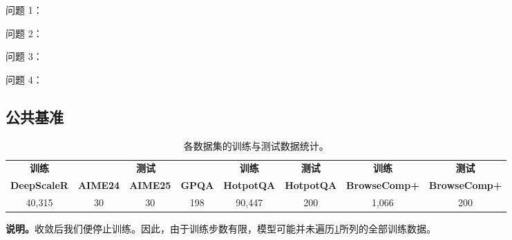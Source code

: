 \begin{userprompt}[title={答案}]
问题 1：

问题 2：

问题 3：

问题 4：
\end{userprompt}

\subsection{公共基准}

\begin{table}[h]
\centering
\small
\setlength{\tabcolsep}{8pt}
\begin{tabular}{c c c c c c c c}
\toprule
\multicolumn{1}{c}{\textbf{训练}} 
& \multicolumn{3}{c}{\textbf{测试}} 
& \multicolumn{1}{c}{\textbf{训练}} 
& \multicolumn{1}{c}{\textbf{测试}} 
& \multicolumn{1}{c}{\textbf{训练}} 
& \multicolumn{1}{c}{\textbf{测试}} \\
\cmidrule(lr){2-4}
\textbf{DeepScaleR}
& \textbf{AIME24}
& \textbf{AIME25}
& \textbf{GPQA}
& \textbf{HotpotQA}
& \textbf{HotpotQA}
& \textbf{BrowseComp+}
& \textbf{BrowseComp+} \\
\midrule
40,315 & 30 & 30 & 198 & 90,447 & 200 & 1,066 & 200 \\
\bottomrule
\end{tabular}
\caption{各数据集的训练与测试数据统计。}
\label{tab:dataset_stats}
\end{table}

\textbf{说明。}\ourframework 收敛后我们便停止训练。因此，由于训练步数有限，模型可能并未遍历\cref{tab:dataset_stats}所列的全部训练数据。

